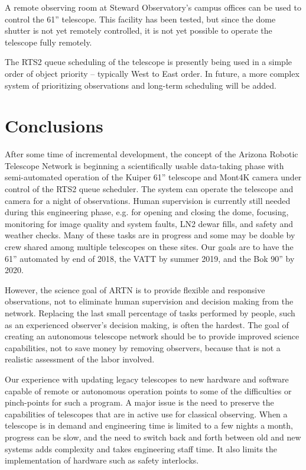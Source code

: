 \documentclass[]{spie}  %
\begin{document}
A remote observing room at Steward Observatory's campus offices can be used to control the 61'' telescope. This facility has been tested, but since the dome shutter is not yet remotely controlled, it is not yet possible to operate the telescope fully remotely.  

The RTS2 queue scheduling of the telescope is presently being used in a simple order of object priority -- typically West to East order. In future, a more complex system of prioritizing observations and long-term scheduling will be added.

\section{Conclusions}

After some time of incremental development, the concept of the Arizona Robotic Telescope Network is beginning a scientifically usable data-taking phase with semi-automated operation of the Kuiper 61'' telescope and Mont4K camera under control of the RTS2 queue scheduler.  The system can operate the telescope and camera for a night of observations. Human supervision is currently still needed during this engineering phase, e.g. for opening and closing the dome, focusing, monitoring for image quality and system faults, LN2 dewar fills, and safety and weather checks. Many of these tasks are in progress and some may be doable by crew shared among multiple telescopes on these sites.  Our goals are to have the 61'' automated by end of 2018, the VATT by summer 2019, and the Bok 90'' by 2020.

However, the science goal of ARTN is to provide flexible and responsive observations, not to eliminate human supervision and decision making  from the network. Replacing the last small percentage of tasks performed by people, such as an experienced observer's decision making, is often the hardest. The goal of creating an autonomous telescope network should be to provide improved science capabilities, not to save money by removing observers, because that is not a realistic assessment of the labor involved.

Our experience with updating legacy telescopes to new hardware and software capable of remote or autonomous operation points to some of the difficulties or pinch-points for such a program. A major issue is the need to preserve the capabilities of telescopes that are in active use for classical observing. When a telescope is in demand and engineering time is limited to a few nights a month, progress can be slow, and the need to switch back and forth between old and new systems adds complexity and takes engineering staff time. It also limits the implementation of hardware such as safety interlocks. 
\end{document}
